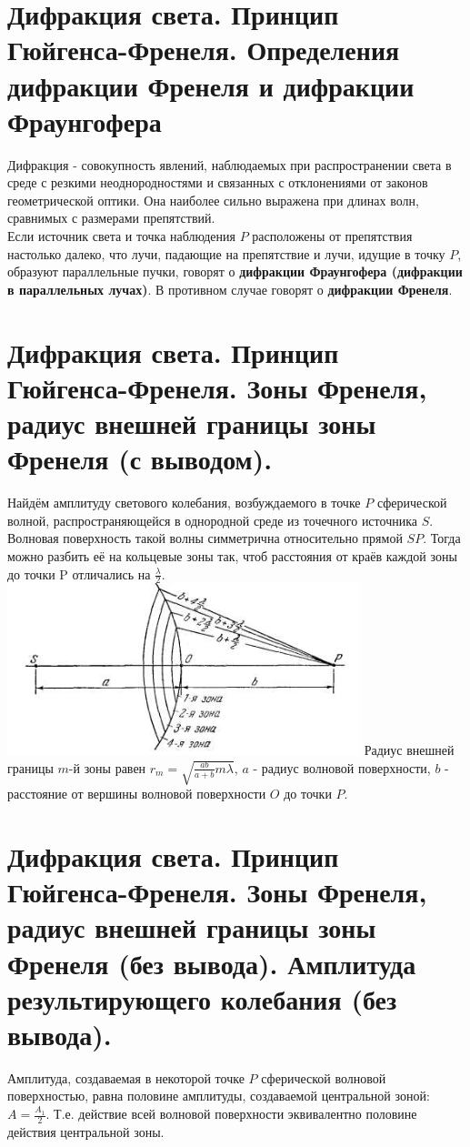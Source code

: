 \documentclass[14pt]{extarticle}
\begin{document}
\section{Дифракция света. Принцип Гюйгенса-Френеля. 
Определения дифракции Френеля и дифракции Фраунгофера}
Дифракция - совокупность явлений, наблюдаемых при распространении света в среде
с резкими неоднородностями и связанных с отклонениями от законов геометрической
оптики. Она наиболее сильно выражена при длинах волн, сравнимых с размерами
препятствий.\\
Если источник света и точка наблюдения $P$ расположены от препятствия настолько 
далеко, что лучи, падающие на препятствие и лучи, идущие в точку $P$, 
образуют параллельные пучки, говорят о 
\textbf{дифракции Фраунгофера (дифракции в параллельных лучах)}. В противном 
случае говорят о \textbf{дифракции Френеля}. 
\section{Дифракция света. Принцип Гюйгенса-Френеля. Зоны Френеля, радиус внешней
границы зоны Френеля (с выводом).}
Найдём амплитуду светового колебания, возбуждаемого в точке $P$ сферической
волной, распространяющейся в однородной среде из точечного источника $S$.
Волновая поверхность такой волны симметрична относительно прямой $SP$. Тогда 
можно разбить её на кольцевые зоны так, чтоб расстояния от краёв каждой зоны 
до точки P отличались на $\frac{\lambda}{2}$. 
\includegraphics{frenel_zones.png}
Радиус внешней границы $m$-й зоны равен $r_m = \sqrt{\frac{ab}{a+b}m \lambda}$,
$a$ - радиус волновой поверхности,  
$b$ - расстояние от вершины волновой поверхности $O$ до точки $P$.
\section{Дифракция света. Принцип Гюйгенса-Френеля. Зоны Френеля, радиус внешней
границы зоны Френеля (без вывода). Амплитуда результирующего колебания (без
вывода).}
Амплитуда, создаваемая в некоторой точке $P$ сферической волновой 
поверхностью, равна половине амплитуды, создаваемой центральной зоной:
$A = \frac{A_1}{2}$. Т.е. действие всей волновой поверхности эквивалентно 
половине действия центральной зоны. 
\end{document}
